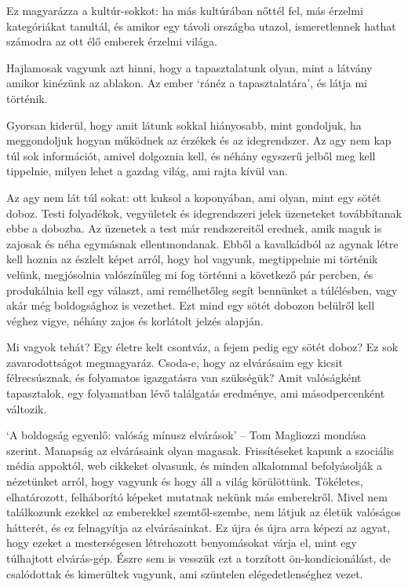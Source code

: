 Ez magyarázza a kultúr-sokkot: ha más kultúrában nőttél fel, más érzelmi
kategóriákat tanultál, és amikor egy távoli országba utazol,
ismeretlennek hathat számodra az ott élő emberek érzelmi világa.

Hajlamosak vagyunk azt hinni, hogy a tapasztalatunk olyan, mint a
látvány amikor kinézünk az ablakon. Az ember `ránéz a tapasztalatára',
és látja mi történik.

Gyorsan kiderül, hogy amit látunk sokkal hiányosabb, mint gondoljuk, ha
meggondoljuk hogyan működnek az érzékek és az idegrendszer. Az agy nem
kap túl sok információt, amivel dolgoznia kell, és néhány egyszerű
jelből meg kell tippelnie, milyen lehet a gazdag világ, ami rajta kívül
van.

Az agy nem lát túl sokat: ott kuksol a koponyában, ami olyan, mint egy
sötét doboz. Testi folyadékok, vegyületek és idegrendszeri jelek
üzeneteket továbbítanak ebbe a dobozba. Az üzenetek a test már
rendszereitől erednek, amik maguk is zajosak és néha egymásnak
ellentmondanak. Ebből a kavalkádból az agynak létre kell hoznia az
észlelt képet arról, hogy hol vagyunk, megtippelnie mi történik velünk,
megjósolnia valószínűleg mi fog történni a következő pár percben, és
produkálnia kell egy választ, ami remélhetőleg segít bennünket a
túlélésben, vagy akár még boldogsághoz is vezethet. Ezt mind egy sötét
dobozon belülről kell véghez vigye, néhány zajos és korlátolt jelzés
alapján.

\clearpage

Mi vagyok tehát? Egy életre kelt csontváz, a fejem pedig egy sötét
doboz? Ez sok zavarodottságot megmagyaráz. Csoda-e, hogy az elvárásaim
egy kicsit félrecsúsznak, és folyamatos igazgatásra van szükségük? Amit
valóságként tapasztalok, egy folyamatban lévő találgatás eredménye, ami
másodpercenként változik.

`A boldogság egyenlő: valóság mínusz elvárások' -- Tom Magliozzi mondása
szerint. Manapság az elvárásaink olyan magasak. Frissítéseket kapunk a
szociális média appoktól, web cikkeket olvasunk, és minden alkalommal
befolyásolják a nézetünket arról, hogy vagyunk és hogy áll a világ
körülöttünk. Tökéletes, elhatározott, felháborító képeket mutatnak
nekünk más emberekről. Mivel nem találkozunk ezekkel az emberekkel
szemtől-szembe, nem látjuk az életük valóságos hátterét, és ez
felnagyítja az elvárásainkat. Ez újra és újra arra képezi az agyat, hogy
ezeket a mesterségesen létrehozott benyomásokat várja el, mint egy
túlhajtott elvárás-gép. Észre sem is vesszük ezt a torzított
ön-kondicionálást, de csalódottak és kimerültek vagyunk, ami szüntelen
elégedetlenséghez vezet.

